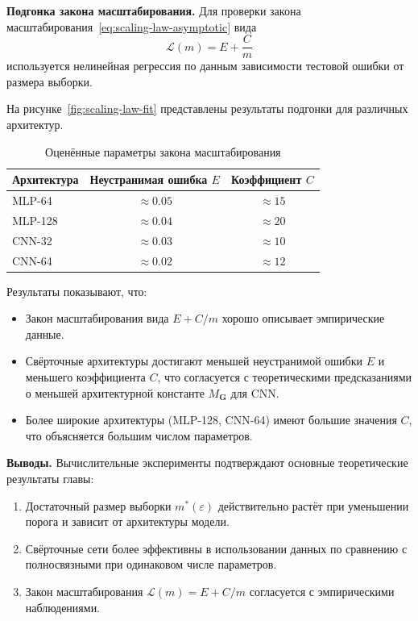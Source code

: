 \textbf{Подгонка закона масштабирования.} Для проверки закона масштабирования~\eqref{eq:scaling-law-asymptotic} вида
\begin{equation}
    \mathcal{L}(m) = E + \frac{C}{m}
\end{equation}
используется нелинейная регрессия по данным зависимости тестовой ошибки от размера выборки.

На рисунке~\ref{fig:scaling-law-fit} представлены результаты подгонки для различных архитектур.


\begin{table}[ht]
    \centering
    \caption{Оценённые параметры закона масштабирования}
    \label{tab:scaling-law-params}
    \begin{tabular}{|l|c|c|}
        \hline
        Архитектура & Неустранимая ошибка $E$ & Коэффициент $C$ \\
        \hline
        MLP-64 & $\approx 0.05$ & $\approx 15$ \\
        MLP-128 & $\approx 0.04$ & $\approx 20$ \\
        CNN-32 & $\approx 0.03$ & $\approx 10$ \\
        CNN-64 & $\approx 0.02$ & $\approx 12$ \\
        \hline
    \end{tabular}
\end{table}

Результаты показывают, что:
\begin{itemize}
    \item Закон масштабирования вида $E + C/m$ хорошо описывает эмпирические данные.
    \item Свёрточные архитектуры достигают меньшей неустранимой ошибки $E$ и меньшего коэффициента $C$, что согласуется с теоретическими предсказаниями о меньшей архитектурной константе $M_{\mathbf{G}}$ для CNN.
    \item Более широкие архитектуры (MLP-128, CNN-64) имеют большие значения $C$, что объясняется большим числом параметров.
\end{itemize}

\textbf{Выводы.} Вычислительные эксперименты подтверждают основные теоретические результаты главы:
\begin{enumerate}
    \item Достаточный размер выборки $m^*(\varepsilon)$ действительно растёт при уменьшении порога и зависит от архитектуры модели.
    \item Свёрточные сети более эффективны в использовании данных по сравнению с полносвязными при одинаковом числе параметров.
    \item Закон масштабирования $\mathcal{L}(m) = E + C/m$ согласуется с эмпирическими наблюдениями.
\end{enumerate}

